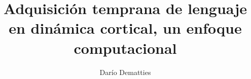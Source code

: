 \documentclass[a4paper,12pt,twoside]{report}
\begin{document}
\title{\LARGE {\bf Adquisición temprana de lenguaje en dinámica cortical, un enfoque computacional}\\
 \vspace*{6mm}
}

\author{Dar\'io Dematties}
\normallinespacing
\maketitle


\preface

%
%
%

\body










\appendix




\end{document}
